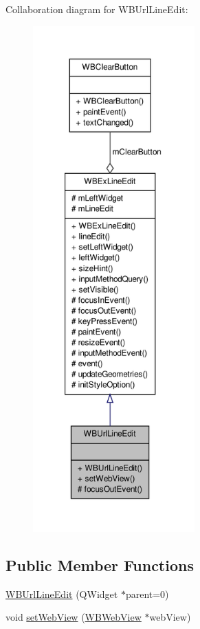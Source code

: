 Collaboration diagram for W\-B\-Url\-Line\-Edit\-:
\nopagebreak
\begin{figure}[H]
\begin{center}
\leavevmode
\includegraphics[height=550pt]{d2/dc6/class_w_b_url_line_edit__coll__graph}
\end{center}
\end{figure}
\subsection*{Public Member Functions}
\begin{DoxyCompactItemize}
\item 
\hyperlink{class_w_b_url_line_edit_aacd30bac6a5628dadf148fa6336c883f}{W\-B\-Url\-Line\-Edit} (Q\-Widget $\ast$parent=0)
\item 
void \hyperlink{class_w_b_url_line_edit_a599a1ac7fe0bd0430e1480e76aebc474}{set\-Web\-View} (\hyperlink{class_w_b_web_view}{W\-B\-Web\-View} $\ast$web\-View)
\end{DoxyCompactItemize}
